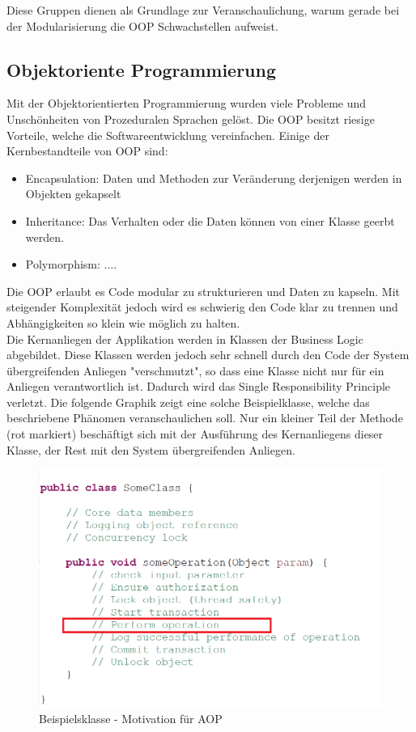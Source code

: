 Diese Gruppen dienen als Grundlage zur Veranschaulichung, warum gerade bei der Modularisierung die OOP Schwachstellen aufweist.\newpage

\subsection{Objektoriente Programmierung}
\label{sec:aop_oop}

Mit der Objektorientierten Programmierung wurden viele Probleme und Unschönheiten von Prozeduralen Sprachen gelöst. Die OOP besitzt riesige Vorteile, welche die Softwareentwicklung vereinfachen. Einige der Kernbestandteile von OOP sind:

\begin{itemize}
	\item Encapsulation: Daten und Methoden zur Veränderung derjenigen werden in Objekten gekapselt
	\item Inheritance: Das Verhalten oder die Daten können von einer Klasse geerbt werden.
	\item Polymorphism: ....
\end{itemize}

Die OOP erlaubt es Code modular zu strukturieren und Daten zu kapseln. Mit steigender Komplexität jedoch wird es schwierig den Code klar zu trennen und Abhängigkeiten so klein wie möglich zu halten.\\

Die Kernanliegen der Applikation werden in Klassen der Business Logic abgebildet. Diese Klassen werden jedoch sehr schnell durch den Code der System übergreifenden Anliegen "verschmutzt", so dass eine Klasse nicht nur für ein Anliegen verantwortlich ist. Dadurch wird das Single Responsibility Principle verletzt. Die folgende Graphik zeigt eine solche Beispielklasse, welche das beschriebene Phänomen veranschaulichen soll. Nur ein kleiner Teil der Methode (rot markiert) beschäftigt sich mit der Ausführung des Kernanliegens dieser Klasse, der Rest mit den System übergreifenden Anliegen.

\begin{figure}[H]
	\centering
		\includegraphics[scale=1.0]{bilder/motivationprogram.png}
	\caption{Beispielsklasse - Motivation für AOP}
	\label{fig:classmotivationaop}
\end{figure}



